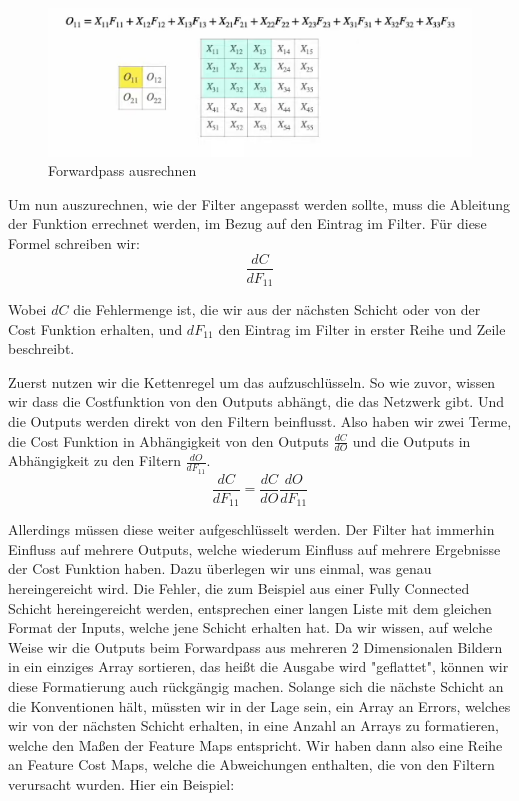 \documentclass[12pt]{article}
\begin{document}

\begin{figure}[H]
\centering
\includegraphics[scale=0.50]{./Images/TemporaryPlaceholders/Bildschirmfoto vom 2024-05-20 15-40-51.png}
\caption{Forwardpass ausrechnen}
\label{Forwardpass ausrechnen}
\end{figure}

Um nun auszurechnen, wie der Filter angepasst werden sollte, muss die Ableitung der Funktion errechnet werden, im Bezug auf den Eintrag im Filter. Für diese Formel schreiben wir:
$$\frac{dC}{dF_{11}}$$

Wobei $dC$ die Fehlermenge ist, die wir aus der nächsten Schicht oder von der Cost Funktion erhalten, und $dF_{11}$ den Eintrag im Filter in erster Reihe und Zeile beschreibt.

Zuerst nutzen wir die Kettenregel um das aufzuschlüsseln. So wie zuvor, wissen wir dass die Costfunktion von den Outputs abhängt, die das Netzwerk gibt. Und die Outputs werden direkt von den Filtern beinflusst. Also haben wir zwei Terme, die Cost Funktion in Abhängigkeit von den Outputs $\frac{dC} {dO} $ und die Outputs in Abhängigkeit zu den Filtern $ \frac{dO} {dF_{11}}$.
$$\frac{dC}{dF_{11}} = \frac{dC} {dO} \frac{dO} {dF_{11}}$$

Allerdings müssen diese weiter aufgeschlüsselt werden. Der Filter hat immerhin Einfluss auf mehrere Outputs, welche wiederum Einfluss auf mehrere Ergebnisse der Cost Funktion haben. Dazu überlegen wir uns einmal, was genau hereingereicht wird. Die Fehler, die zum Beispiel aus einer Fully Connected Schicht hereingereicht werden, entsprechen einer langen Liste mit dem gleichen Format der Inputs, welche jene Schicht erhalten hat. Da wir wissen, auf welche Weise wir die Outputs beim Forwardpass aus mehreren 2 Dimensionalen Bildern in ein einziges Array sortieren, das heißt die Ausgabe wird "geflattet", können wir diese Formatierung auch rückgängig machen. Solange sich die nächste Schicht an die Konventionen hält, müssten wir in der Lage sein, ein Array an Errors, welches wir von der nächsten Schicht erhalten, in eine Anzahl an Arrays zu formatieren, welche den Maßen der Feature Maps entspricht.
Wir haben dann also eine Reihe an Feature Cost Maps, welche die Abweichungen enthalten, die von den Filtern verursacht wurden. Hier ein Beispiel:
\end{document}
